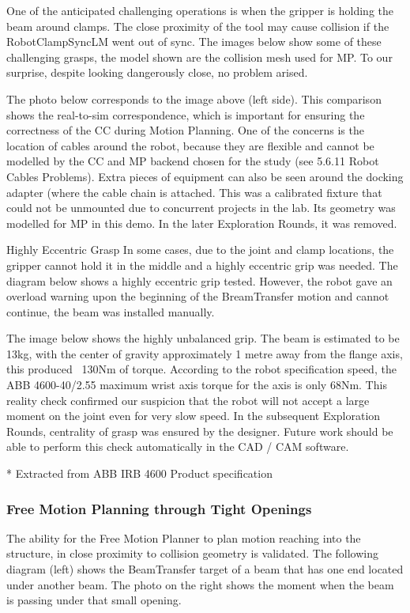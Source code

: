 One of the anticipated challenging operations is when the gripper is holding the beam around clamps. The close proximity of the tool may cause collision if the RobotClampSyncLM went out of sync. The images below show some of these challenging grasps, the model shown are the collision mesh used for MP. To our surprise, despite looking dangerously close, no problem arised.

The photo below corresponds to the image above (left side). This comparison shows the real-to-sim correspondence, which is important for ensuring the correctness of the CC during Motion Planning. One of the concerns is the location of cables around the robot, because they are flexible and cannot be modelled by the CC and MP backend chosen for the study (see 5.6.11 Robot Cables Problems).
Extra pieces of equipment can also be seen around the docking adapter (where the cable chain is attached. This was a calibrated fixture that could not be unmounted due to concurrent projects in the lab. Its geometry was modelled for MP in this demo. In the later Exploration Rounds, it was removed.


Highly Eccentric Grasp 
In some cases, due to the joint and clamp locations, the gripper cannot hold it in the middle and a highly eccentric grip was needed. The diagram below shows a highly eccentric grip tested. However, the robot gave an overload warning upon the beginning of the BreamTransfer motion and cannot continue, the beam was installed manually. 

The image below shows the highly unbalanced grip. The beam is estimated to be 13kg, with the center of gravity approximately 1 metre away from the flange axis, this produced ~130Nm of torque. According to the robot specification speed, the ABB 4600-40/2.55 maximum wrist axis torque for the axis is only 68Nm. This reality check confirmed our suspicion that the robot will not accept a large moment on the joint even for very slow speed. In the subsequent Exploration Rounds, centrality of grasp was ensured by the designer. Future work should be able to perform this check automatically in the CAD / CAM software.


* Extracted from ABB IRB 4600 Product specification 
\subsubsection{Free Motion Planning through Tight Openings}
\label{subsubsection:exploration_2_free_motion_planning_through_tight_openings}

The ability for the Free Motion Planner to plan motion reaching into the structure, in close proximity to collision geometry is validated. The following diagram (left) shows the BeamTransfer target of a beam that has one end located under another beam. The photo on the right shows the moment when the beam is passing under that small opening. 


